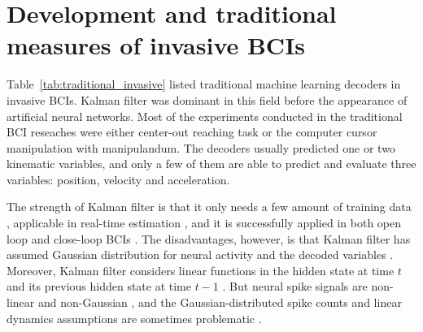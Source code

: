 \section{Development and traditional measures of invasive BCIs}
Table~\ref{tab:traditional_invasive} listed traditional machine learning decoders in invasive BCIs.
Kalman filter was dominant in this field before the appearance of artificial neural networks.
Most of the experiments conducted in the traditional BCI reseaches were either center-out reaching task or the computer cursor manipulation with manipulandum.
The decoders usually predicted one or two kinematic variables, 
and only a few of them are able to predict and evaluate three variables: position, velocity and acceleration.


The strength of Kalman filter is that it only needs a few amount of training data \citep{wu2003neural},
applicable in real-time estimation \citep{wu2003neural},
and it is successfully applied in both open loop and close-loop BCIs \citep{gupta2009offline}.
The disadvantages, however, 
is that Kalman filter has assumed Gaussian distribution for neural activity and the decoded variables \citep{glaser2020machine, ahmadi2019decoding, todorova2017neural}.
Moreover, Kalman filter considers linear functions in the hidden state at time $t$ and its previous hidden state at time $t-1$ \citep{glaser2020machine}.
But neural spike signals are non-linear and non-Gaussian \citep{macke2011empirical, holleman2008micro},
and the Gaussian-distributed spike counts and linear dynamics assumptions are sometimes problematic \citep{makin2018}.


 

